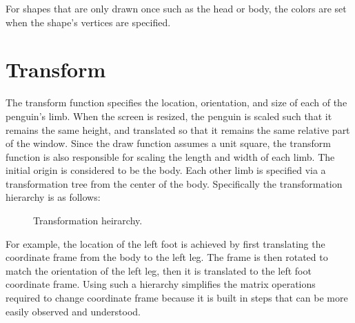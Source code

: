 \documentclass{scrartcl}
\begin{document}
For shapes that are only drawn once such as the head or body, the colors are set when the shape's vertices are specified.\\

\section{Transform}


The transform function specifies the location, orientation, and size of each of the penguin's limb. When the screen is resized, the penguin is scaled such that it remains the same height, and translated so that it remains the same relative part of the window. Since the draw function assumes a unit square, the transform function is also responsible for scaling the length and width of each limb. The initial origin is considered to be the body. Each other limb is specified via a transformation tree from the center of the body. Specifically the transformation hierarchy is as follows:


\begin{figure}[!h]
 \centering

 \caption{Transformation heirarchy.}
 
\end{figure}


For example, the location of the left foot is achieved by first translating the coordinate frame from the body to the left leg. The frame is then rotated to match the orientation of
the left leg, then it is translated to the left foot coordinate frame. Using such a hierarchy simplifies the matrix operations required to change coordinate frame because it is built
in steps that can be more easily observed and understood.\\
\end{document}
